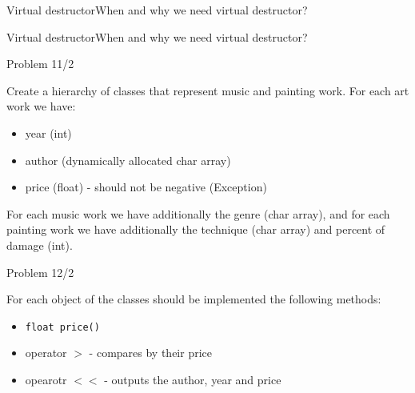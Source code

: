 
\begin{frame}[fragile]{Virtual destructor}{When and why we need virtual
destructor?}

\end{frame}

\begin{frame}[fragile]{Virtual destructor}{When and why we need virtual
destructor?}

\end{frame}

\begin{frame}{Problem 1}{1/2}
\begin{scriptsize}
Create a hierarchy of classes that represent music and painting work. 
For each art work we have:
\begin{itemize}
  \item year (int)
  \item author (dynamically allocated char array)
  \item price (float) - should not be negative (Exception)
\end{itemize}
For each music work we have additionally the genre (char array), and for each
painting work we have additionally the technique (char array) and percent of
damage (int).

\end{scriptsize}
\end{frame}

\begin{frame}{Problem 1}{2/2}
\begin{scriptsize}
For each object of the classes should be implemented the following methods:
\begin{itemize}
  \item \texttt{float price()}
  \begin{itemize}
   \end{itemize}
   \item operator $>$ - compares by their price
   \item opearotr $<<$ - outputs the author, year and price
\end{itemize}

\end{scriptsize}
\end{frame}

